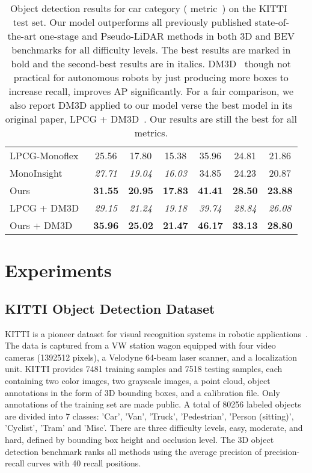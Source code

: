 \documentclass[10pt,twocolumn,letterpaper]{article}
\begin{document}
\begin{table*}
\begin{tabular}{l|ccc|ccc}
    LPCG-Monoflex~\cite{Peng2021LidarPC} & 25.56     & 17.80     & 15.38     & 35.96     & 24.81      & 21.86     \\
    MonoInsight~\cite{Haq2022OneSM}   & \emph{27.71}   & \emph{19.04}   & \emph{16.03}   & 34.85     & 24.23      & 20.87     \\
    Ours               & \bf{31.55} & \bf{20.95} & \bf{17.83} & \bf{41.41} & \bf{28.50}  & \bf{23.88} \\
    \hline
    LPCG + DM3D~\cite{peng2022digging}     & \emph{29.15}   & \emph{21.24}   & \emph{19.18}   & \emph{39.74}   & \emph{28.84}    & \emph{26.08}   \\
    Ours + DM3D        & \bf{35.96} & \bf{25.02} & \bf{21.47} & \bf{46.17} & \bf{33.13}  & \bf{28.80} \\
    \bottomrule
  \end{tabular}
  \caption{Object detection results for car category ( metric~\cite{Simonelli_2019_ICCV}) on the KITTI~\cite{Geiger2012AreWR} test set. Our model outperforms all previously published state-of-the-art one-stage and Pseudo-LiDAR methods in both 3D and BEV benchmarks for all difficulty levels. The best results are marked in bold and the second-best results are in italics. DM3D~\cite{peng2022digging} though not practical for autonomous robots by just producing more boxes to increase recall, improves AP significantly. For a fair comparison, we also report DM3D applied to our model verse the best model in its original paper, LPCG + DM3D~\cite{peng2022digging}. Our results are still the best for all metrics.}
  \label{tab:benchmark_evaluation}
\end{table*} 
\section{Experiments}
\label{sec:Experiments}

\subsection{KITTI Object Detection Dataset}
KITTI is a pioneer dataset for visual recognition systems in robotic applications~\cite{Geiger2012AreWR}. The data is captured from a VW station wagon equipped with four video cameras (1392512 pixels), a Velodyne 64-beam laser scanner, and a localization unit. KITTI provides 7481 training samples and 7518 testing samples, each containing two color images, two grayscale images, a point cloud, object annotations in the form of 3D bounding boxes, and a calibration file. Only annotations of the training set are made public. A total of 80256 labeled objects are divided into 7 classes: 'Car', 'Van', 'Truck', 'Pedestrian', 'Person (sitting)', 'Cyclist', 'Tram' and 'Misc'. There are three difficulty levels, easy, moderate, and hard, defined by bounding box height and occlusion level. The 3D object detection benchmark ranks all methods using the average precision of precision-recall curves with 40 recall positions.
\end{document}
